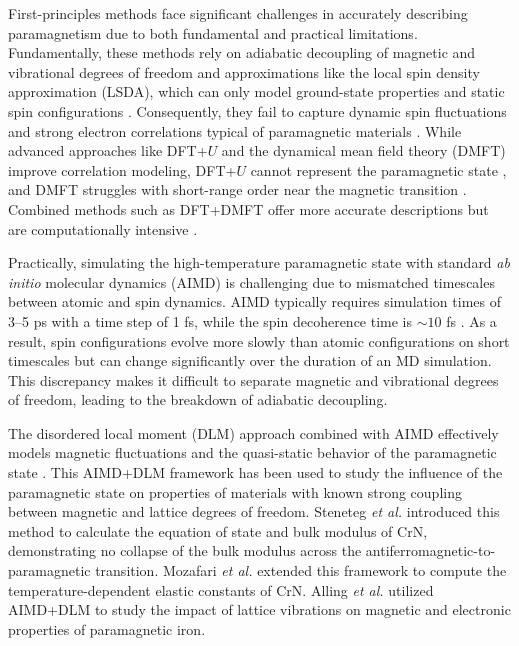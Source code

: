 \documentclass[preprint, 12pt]{elsarticle}
\newcommand{\?}{\stackrel{?}{=}}
\begin{document}
First-principles methods face significant challenges in accurately describing paramagnetism due to both fundamental and practical limitations. Fundamentally, these methods rely on adiabatic decoupling of magnetic and vibrational degrees of freedom \cite{Abrikosov2016} and approximations like the local spin density approximation (LSDA), which can only model ground-state properties and static spin configurations \cite{Giustino2014}. Consequently, they fail to capture dynamic spin fluctuations and strong electron correlations typical of paramagnetic materials \cite{Kotliar2004}. While advanced approaches like DFT+$U$ and the dynamical mean field theory (DMFT) improve correlation modeling, DFT+$U$ cannot represent the paramagnetic state \cite{Liu2019, Shousha2024}, and DMFT struggles with short-range order near the magnetic transition \cite{Abrikosov2016}. Combined methods such as DFT+DMFT offer more accurate descriptions but are computationally intensive \cite{Kotliar2004, Steneteg2012}.

Practically, simulating the high-temperature paramagnetic state with standard \textit{ab initio} molecular dynamics (AIMD) is challenging due to mismatched timescales between atomic and spin dynamics. AIMD typically requires simulation times of 3--5 ps with a time step of 1 fs, while the spin decoherence time is $\sim 10$ fs \cite{Steneteg2012, Abrikosov2016}. As a result, spin configurations evolve more slowly than atomic configurations on short timescales but can change significantly over the duration of an MD simulation. This discrepancy makes it difficult to separate magnetic and vibrational degrees of freedom, leading to the breakdown of adiabatic decoupling.

The disordered local moment (DLM) approach combined with AIMD effectively models magnetic fluctuations and the quasi-static behavior of the paramagnetic state \cite{Abrikosov2016}. This AIMD+DLM framework has been used to study the influence of the paramagnetic state on properties of materials with known strong coupling between magnetic and lattice degrees of freedom. Steneteg \textit{et al.} \cite{Steneteg2012} introduced this method to calculate the equation of state and bulk modulus of CrN, demonstrating no collapse of the bulk modulus across the antiferromagnetic-to-paramagnetic transition. Mozafari \textit{et al.} \cite{Mozafari2016} extended this framework to compute the temperature-dependent elastic constants of CrN. Alling \textit{et al.} \cite{Alling2016} utilized AIMD+DLM to study the impact of lattice vibrations on magnetic and electronic properties of paramagnetic iron.
\end{document}
